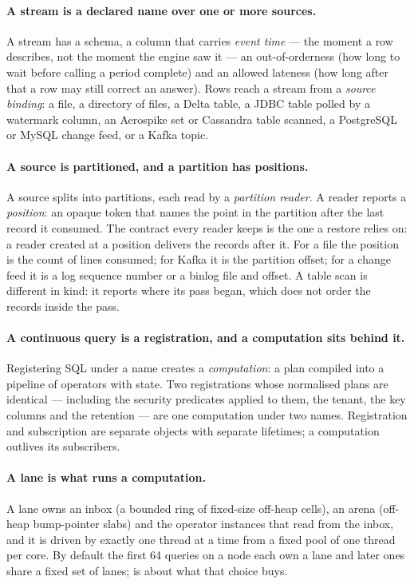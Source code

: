\documentclass[11pt,a4paper]{article}
\renewcommand{\_}{\oldunderscore\allowbreak}
\begin{document}
\paragraph{A stream is a declared name over one or more sources.} A stream has a schema, a column
that carries \emph{event time} --- the moment a row describes, not the moment the engine saw it ---
an out-of-orderness (how long to wait before calling a period complete) and an allowed lateness (how
long after that a row may still correct an answer). Rows reach a stream from a \emph{source binding}:
a file, a directory of files, a Delta table, a JDBC table polled by a watermark column, an Aerospike
set or Cassandra table scanned, a PostgreSQL or MySQL change feed, or a Kafka topic.

\paragraph{A source is partitioned, and a partition has positions.} A source splits into partitions,
each read by a \emph{partition reader}. A reader reports a \emph{position}: an opaque token that
names the point in the partition after the last record it consumed. The contract every reader keeps
is the one a restore relies on: a reader created at a position delivers the records after it. For
a file the position is the count of lines consumed; for Kafka it is the partition offset; for a
change feed it is a log sequence number or a binlog file and offset. A table scan is different in
kind: it reports where its pass began, which does not order the records inside the pass.

\paragraph{A continuous query is a registration, and a computation sits behind it.} Registering SQL
under a name creates a \emph{computation}: a plan compiled into a pipeline of operators with state.
Two registrations whose normalised plans are identical --- including the security predicates applied
to them, the tenant, the key columns and the retention --- are one computation under two names.
Registration and subscription are separate objects with separate lifetimes; a computation outlives
its subscribers.

\paragraph{A lane is what runs a computation.} A lane owns an inbox (a bounded ring of fixed-size
off-heap cells), an arena (off-heap bump-pointer slabs) and the operator instances that read from the
inbox, and it is driven by exactly one thread at a time from a fixed pool of one thread per core. By
default the first 64 queries on a node each own a lane and later ones share a fixed set of lanes;
 is about what that choice buys.
\end{document}
